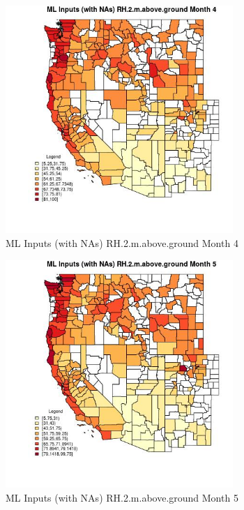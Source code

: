 \begin{figure} 
\centering  
\includegraphics[width=0.77\textwidth]{Code_Outputs/Report_ML_input_PM25_Step4_part_f_de_duplicated_aveswNAs_CountyRH2mabovegroundmedianMonth4.jpg} 
\caption{\label{fig:Report_ML_input_PM25_Step4_part_f_de_duplicated_aveswNAsCountyRH2mabovegroundmedianMonth4}ML Inputs (with NAs) RH.2.m.above.ground Month 4} 
\end{figure} 
 

\begin{figure} 
\centering  
\includegraphics[width=0.77\textwidth]{Code_Outputs/Report_ML_input_PM25_Step4_part_f_de_duplicated_aveswNAs_CountyRH2mabovegroundmedianMonth5.jpg} 
\caption{\label{fig:Report_ML_input_PM25_Step4_part_f_de_duplicated_aveswNAsCountyRH2mabovegroundmedianMonth5}ML Inputs (with NAs) RH.2.m.above.ground Month 5} 
\end{figure} 
 

